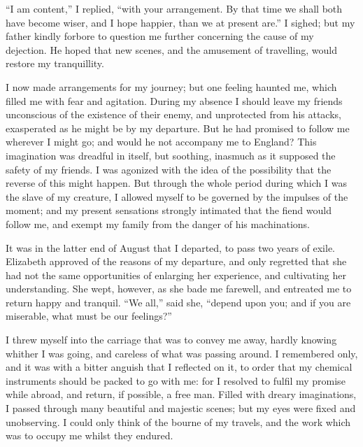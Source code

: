 ``I am content,'' I replied, ``with
your arrangement. By that time we
shall both have become wiser, and I
hope happier, than we at present are.''
I sighed; but my father kindly forbore
to question me further concerning the
cause of my dejection. He hoped that
new scenes, and the amusement of travelling,
would restore my tranquillity.

I now made arrangements for my
journey; but one feeling haunted me,
which filled me with fear and agitation.
During my absence I should leave my
friends unconscious of the existence of
their enemy, and unprotected from his
attacks, exasperated as he might be
by my departure. But he had promised
to follow me wherever I might go; and
would he not accompany me to England?
This imagination was dreadful
in itself, but soothing, inasmuch as it
supposed the safety of my friends. I
was agonized with the idea of the possibility
that the reverse of this might
happen. But through the whole period
during which I was the slave of my
creature, I allowed myself to be governed
by the impulses of the moment;
and my present sensations strongly intimated
that the fiend would follow me,
and exempt my family from the danger
of his machinations.

It was in the latter end of August
that I departed, to pass two years of
exile. Elizabeth approved of the reasons
of my departure, and only regretted
that she had not the same opportunities
of enlarging her experience,
and cultivating her understanding. She
wept, however, as she bade me farewell,
and entreated me to return happy
and tranquil. ``We all,'' said she,
``depend upon you; and if you are
miserable, what must be our feelings?''

I threw myself into the carriage that
was to convey me away, hardly knowing
whither I was going, and careless
of what was passing around. I remembered
only, and it was with a
bitter anguish that I reflected on it,
to order that my chemical instruments
should be packed to go with me: for
I resolved to fulfil my promise while
abroad, and return, if possible, a free
man. Filled with dreary imaginations,
I passed through many beautiful and
majestic scenes; but my eyes were
fixed and unobserving. I could only
think of the bourne of my travels, and
the work which was to occupy me
whilst they endured.

